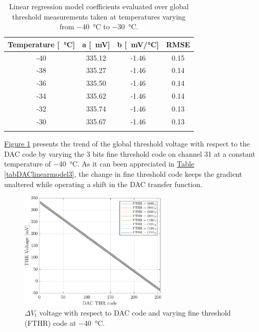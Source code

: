 \begin{table}[h!]
    \centering
    \begin{tabular}{c c c c} 
        \Xhline{2\arrayrulewidth}
        Temperature [\SI{}{\celsius}] & a [\SI{}{\milli\volt}] & b [\SI{}{\milli\volt/\celsius}] & RMSE \T\B \\
        \hline
        -40 & 335.12 & -1.46 & 0.15 \T\B \\
        -38 & 335.27 & -1.46 & 0.14 \T\B \\
        -36 & 335.50 & -1.46 & 0.14 \T\B \\
        -34 & 335.62 & -1.46 & 0.14 \T\B \\
        -32 & 335.74 & -1.46 & 0.13 \T\B \\
        -30 & 335.67 & -1.46 & 0.13 \T\B \\
        \Xhline{2\arrayrulewidth}
    \end{tabular}
    \caption{Linear regression model coefficients evaluated over global threshold measurements taken at temperatures varying from \SI{-40}{\celsius} to \SI{-30}{\celsius}.}
    \label{tabDAClinearmodel2}
\end{table}

\par
\hyperref[figDACfinethrtemp]{Figure \ref{figDACfinethrtemp}} presents the trend of the global threshold voltage with respect to the DAC code by varying the 3 bits fine threshold code on channel 31 at a constant temperature of \SI{-40}{\celsius}. As it can been appreciated in \hyperref[tabDAClinearmodel3]{Table \ref{tabDAClinearmodel3}}, the change in fine threshold code keeps the gradient unaltered while operating a shift in the DAC transfer function.

\begin{figure}[h!]
    \centering
    \includegraphics[width=0.63\textwidth]{Images/chap1/results/DAC_thr/DAC_thr_voltage_FTHR_-40C.pdf}
    \caption{$\Delta V_{\textit{t}}$ voltage with respect to DAC code and varying fine threshold (FTHR) code at \SI{-40}{\celsius}.}
    \label{figDACfinethrtemp}
\end{figure}

